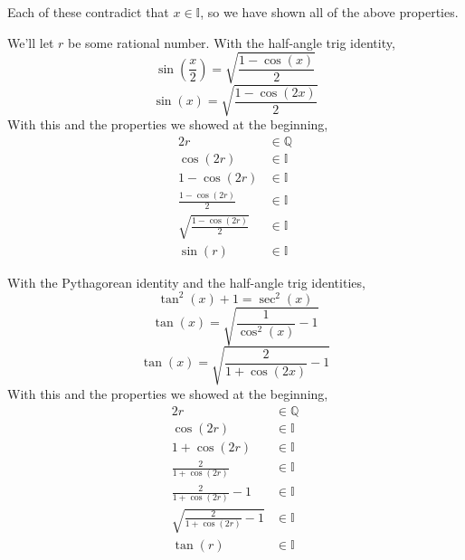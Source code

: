 \documentclass[12pt]{article}
\newcommand{\I}{\mathbb{I}}
\newcommand{\Q}{\mathbb{Q}}
\begin{document}
Each of these contradict that $x\in\I$, so we have shown all of the above properties. \newpage

We'll let $r$ be some rational number. With the half-angle trig identity,
\[\sin\left(\frac{x}{2}\right) = \sqrt{\frac{1-\cos(x)}{2}}\]
\[\sin(x) = \sqrt{\frac{1-\cos(2x)}{2}}\]
With this and the properties we showed at the beginning,
\begin{align*}
    2r &\in\Q \\
    \cos(2r) &\in\I \\
    1 - \cos(2r) &\in\I \\
    \frac{1-\cos(2r)}{2} &\in\I \\
    \sqrt{\frac{1-\cos(2r)}{2}} &\in\I \\
    \sin(r) &\in\I
\end{align*}

With the Pythagorean identity and the half-angle trig identities,
\[\tan^2(x) + 1 = \sec^2(x)\]
\[\tan(x) = \sqrt{\frac{1}{\cos^2(x)} - 1}\]
\[\tan(x) = \sqrt{\frac{2}{1 + \cos(2x)} - 1}\]
With this and the properties we showed at the beginning,
\begin{align*}
    2r &\in\Q \\
    \cos(2r) &\in\I \\
    1 + \cos(2r) &\in\I \\
    \frac{2}{1 + \cos(2r)} &\in\I \\
    \frac{2}{1 + \cos(2r)} - 1 &\in\I \\
    \sqrt{\frac{2}{1 + \cos(2r)} - 1} &\in\I \\
    \tan(r) &\in\I
\end{align*}




        
\end{document}
